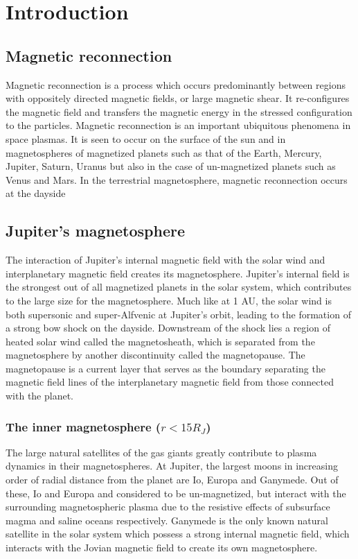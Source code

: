 \chapter{Introduction}

\section{Magnetic reconnection}
Magnetic reconnection is a process which occurs predominantly between regions with oppositely directed magnetic fields, or large magnetic shear. It re-configures the magnetic field and transfers the magnetic energy in the stressed configuration to the particles. Magnetic reconnection is an important ubiquitous phenomena in space plasmas. It is seen to occur on the surface of the sun and in magnetospheres of magnetized planets such as that of the Earth, Mercury, Jupiter, Saturn, Uranus but also in the case of un-magnetized planets such as Venus and Mars. In the terrestrial magnetosphere, magnetic reconnection occurs at the dayside 

\section{Jupiter's magnetosphere}
The interaction of Jupiter's internal magnetic field with the solar wind and interplanetary magnetic field creates its magnetosphere. Jupiter's internal field is the strongest out of all magnetized planets in the solar system, which contributes to the large size for the magnetosphere. Much like at 1 AU, the solar wind is both supersonic and super-Alfvenic at Jupiter's orbit, leading to the formation of a strong bow shock on the dayside. Downstream of the shock lies a region of heated solar wind called the magnetosheath, which is separated from the magnetosphere by another discontinuity called the magnetopause. The magnetopause is a current layer that serves as the boundary separating the magnetic field lines of the interplanetary magnetic field from those connected with the planet. 

\subsection{The inner magnetosphere (\texorpdfstring{$r < 15 R_J$)}{r<15}}
The large natural satellites of the gas giants greatly contribute to plasma dynamics in their magnetospheres. At Jupiter, the largest moons in increasing order of radial distance from the planet are Io, Europa and Ganymede. Out of these, Io and Europa and considered to be un-magnetized, but interact with the surrounding magnetospheric plasma due to the resistive effects of subsurface magma and saline oceans respectively. Ganymede is the only known natural satellite in the solar system which possess a strong internal magnetic field, which interacts with the Jovian magnetic field to create its own magnetosphere. 

